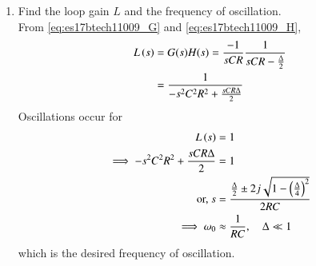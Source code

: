 \begin{enumerate}[label=\arabic*.,ref=\theenumi]
\item Find the loop gain $L$ and the frequency of oscillation.
\\
\solution 
From \eqref{eq:es17btech11009_G} and \eqref{eq:es17btech11009_H},
\begin{align}
L\left(s\right)&= G(s)H(s) =\frac{-1}{sCR}\frac{1}{sCR - \frac{\Delta}{2}}
\\
&= \frac{1}{-s^2C^2R^2 + \frac{sCR\Delta}{2}}
\end{align}
%
Oscillations occur for 
\begin{align}
    L\left(s\right) &= 1
\\
\implies 
    -s^2C^2R^2 + \frac{sCR\Delta}{2} &= 1
\\
\text{or, }     s &= \frac{\frac{\Delta}{2} \pm 2j\sqrt{1 - \left(\frac{\Delta}{4}\right)^2}}{2RC}
\\
\implies \omega_0 &\approx \frac{1}{RC}, \quad \Delta \ll 1
\end{align}
%
which is the desired frequency of oscillation.

\end{enumerate}
